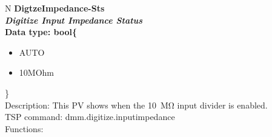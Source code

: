 \documentclass[openany]{article}
\begin{document}
		\begin{tabular}{N}
			\hline
			\bfseries DigtzeImpedance-Sts\label{pv:digtzeimpedance-sts} \\ \hline
			\emph{Digitize Input Impedance Status} \\
			Data type: bool\{\begin{itemize}[noitemsep]
				\small
				\item[] AUTO
				\item[] 10MOhm
			\end{itemize}\} \\
			Description: This PV shows when the \SI{10}{\mega\ohm} input divider is enabled. \\
			TSP command: dmm.digitize.inputimpedance \\
			Functions: \\
			\arrayrulecolor{\FuncTableBorderColor}

		\end{tabular}
\end{document}

